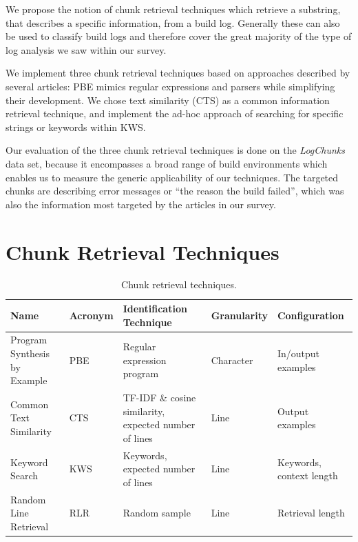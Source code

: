 We propose the notion of chunk retrieval techniques which retrieve
a substring, that describes a specific information, from a build log.
Generally these can also be used to classify build logs and therefore
cover the great majority of the type of log analysis we saw within
our survey.

We implement three chunk retrieval techniques based on approaches
described by several articles:
PBE mimics regular expressions and parsers while simplifying
their development.
We chose text similarity (CTS) as a common information retrieval
technique, and implement the ad-hoc approach of
searching for specific strings or keywords within KWS\@.

Our evaluation of the three chunk retrieval techniques is done on the
\emph{LogChunks} data set, because it encompasses a broad range of
build environments which enables us to measure the generic
applicability of our techniques.
The targeted chunks are describing error messages or
``the reason the build failed'', which was also the information
most targeted by the articles in our survey.


\section{Chunk Retrieval Techniques}
\label{sec:techniques}

\begin{table}[htb]
\centering
\caption{Chunk retrieval techniques.}
\begin{tabularx}{\textwidth}{@{}llXll@{}}
\toprule
Name			     & Acronym & Identification Technique
& Granularity & Configuration \\
\midrule
Program Synthesis by Example & PBE     & Regular expression program
& Character   & In/output examples	\\
Common Text Similarity	     & CTS     & TF-IDF \& cosine similarity,
expected number of lines & Line        & Output examples	   \\
Keyword Search		     & KWS     & Keywords, expected number of
lines			 & Line        & Keywords, context length  \\
Random Line Retrieval	     & RLR     & Random sample
& Line	      & Retrieval length	  \\
\bottomrule
\end{tabularx}
\label{tab:ctr}
\end{table}

